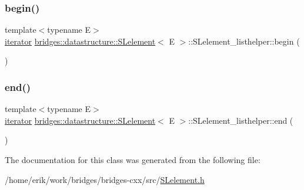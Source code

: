 \subsubsection{\texorpdfstring{begin()}{begin()}}
{\footnotesize\ttfamily template$<$typename E$>$ \\
\hyperlink{classbridges_1_1datastructure_1_1_s_lelement_1_1_s_lelement__listhelper_1_1iterator}{iterator} \hyperlink{classbridges_1_1datastructure_1_1_s_lelement}{bridges\+::datastructure\+::\+S\+Lelement}$<$ E $>$\+::S\+Lelement\+\_\+listhelper\+::begin (\begin{DoxyParamCaption}{ }\end{DoxyParamCaption})\hspace{0.3cm}{\ttfamily [inline]}}

\mbox{\label{classbridges_1_1datastructure_1_1_s_lelement_1_1_s_lelement__listhelper_aecbbc35682d82fa86a746b9a588525d0}} 
\subsubsection{\texorpdfstring{end()}{end()}}
{\footnotesize\ttfamily template$<$typename E$>$ \\
\hyperlink{classbridges_1_1datastructure_1_1_s_lelement_1_1_s_lelement__listhelper_1_1iterator}{iterator} \hyperlink{classbridges_1_1datastructure_1_1_s_lelement}{bridges\+::datastructure\+::\+S\+Lelement}$<$ E $>$\+::S\+Lelement\+\_\+listhelper\+::end (\begin{DoxyParamCaption}{ }\end{DoxyParamCaption})\hspace{0.3cm}{\ttfamily [inline]}}



The documentation for this class was generated from the following file\+:\begin{DoxyCompactItemize}
\item 
/home/erik/work/bridges/bridges-\/cxx/src/\hyperlink{_s_lelement_8h}{S\+Lelement.\+h}\end{DoxyCompactItemize}
